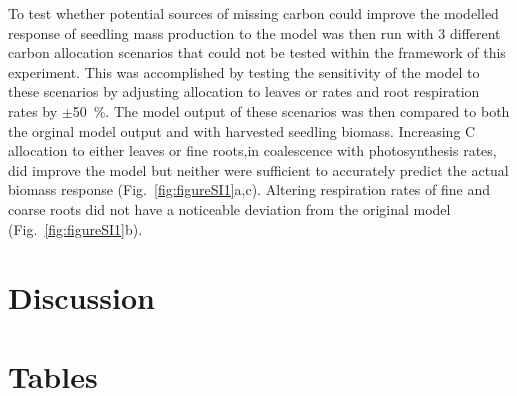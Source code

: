 \documentclass[a4paper]{article}\usepackage[]{graphicx}\usepackage[]{color}
\begin{document}
To test whether potential sources of missing carbon could improve the modelled response of seedling mass production to the model was then run with 3 different carbon allocation scenarios that could not be tested within the framework of this experiment. This was accomplished by testing the sensitivity of the model to these scenarios by adjusting allocation to leaves or rates and root respiration rates by $\pm$50~\%. The model output of these scenarios was then compared to both the orginal model output and with harvested seedling biomass.  Increasing C allocation to either leaves or fine roots,in coalescence with photosynthesis rates, did improve the model but neither were sufficient to accurately predict the actual biomass response  (Fig.~\ref{fig:figureSI1}a,c). Altering respiration rates of fine and coarse roots did not have a noticeable deviation from the original model (Fig.~\ref{fig:figureSI1}b).

\section*{Discussion}


\section*{Tables}
\end{document}
